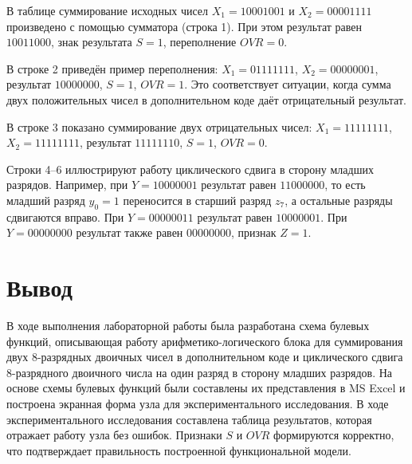 \documentclass[oneside,a4paper,14pt]{extarticle}
\begin{document}
В таблице суммирование исходных чисел $X_1=10001001$ и $X_2=00001111$ произведено с помощью сумматора (строка 1). При этом результат равен $10011000$, знак результата $S=1$, переполнение $OVR=0$.

В строке 2 приведён пример переполнения: $X_1=01111111$, $X_2=00000001$, результат $10000000$, $S=1$, $OVR=1$. Это соответствует ситуации, когда сумма двух положительных чисел в дополнительном коде даёт отрицательный результат.

В строке 3 показано суммирование двух отрицательных чисел: $X_1=11111111$, $X_2=11111111$, результат $11111110$, $S=1$, $OVR=0$.

Строки 4--6 иллюстрируют работу циклического сдвига в сторону младших разрядов. Например, при $Y=10000001$ результат равен $11000000$, то есть младший разряд $y_0=1$ переносится в старший разряд $z_7$, а остальные разряды сдвигаются вправо. При $Y=00000011$ результат равен $10000001$. При $Y=00000000$ результат также равен $00000000$, признак $Z=1$.
\newpage
\section*{Вывод}

В ходе выполнения лабораторной работы была разработана схема булевых функций, описывающая работу арифметико-логического блока для суммирования двух 8-разрядных двоичных чисел в дополнительном коде и циклического сдвига 8-разрядного двоичного числа на один разряд в сторону младших разрядов. На основе схемы булевых функций были составлены их представления в MS Excel и построена экранная форма узла для экспериментального исследования. В ходе экспериментального исследования составлена таблица результатов, которая отражает работу узла без ошибок. Признаки $S$ и $OVR$ формируются корректно, что подтверждает правильность построенной функциональной модели.
\end{document}
